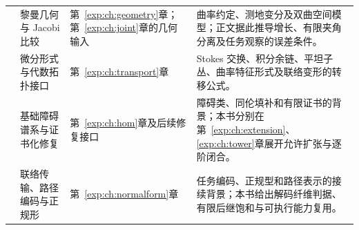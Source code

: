 \documentclass[12pt,a4paper,openany,notitlepage]{report}
\theoremstyle{plain}
\theoremstyle{definition}
\theoremstyle{remark}
\begin{document}
\begin{CJK*}{UTF8}{gkai}
\begin{longtable}{P{0.07\textwidth}P{0.21\textwidth}P{0.22\textwidth}P{0.41\textwidth}}
\cite{ExtLeeRiemann} & 黎曼几何与 Jacobi 比较 & 第~\ref{exp:ch:geometry}章；第~\ref{exp:ch:joint}章的几何输入 & 曲率约定、测地变分及双曲空间模型；正文据此推导增长、有限夹角分离及任务观察的误差条件。\\
\cite{ExtBottTu} & 微分形式与代数拓扑接口 & 第~\ref{exp:ch:transport}章 & Stokes 交换、积分余链、平坦子丛、曲率特征形式及联络变形的转移公式。\\
\cite{S37} & 基础障碍谱系与证书化修复 & 第~\ref{exp:ch:hom}章及后续修复接口 & 障碍类、同伦填补和有限证书的背景；本书分别在第~\ref{exp:ch:extension}、\ref{exp:ch:tower}章展开允许扩张与逐阶闭合。\\
\cite{S19} & 联络传输、路径编码与正规形 & 第~\ref{exp:ch:normalform}章 & 任务编码、正规型和路径表示的接续背景；本书给出解码纤维判据、有限后继饱和与可执行能力复用。\\
\end{longtable}
\normalsize


\end{CJK*}
\end{document}
